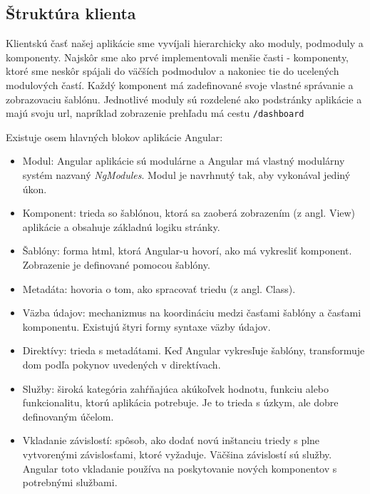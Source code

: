 \subsection{Štruktúra klienta}
\label{subsec:client_structure}

Klientskú časť našej aplikácie sme vyvíjali hierarchicky ako moduly, podmoduly a komponenty.
Najskôr sme ako prvé implementovali menšie časti - komponenty, ktoré sme neskôr spájali do
väčších podmodulov a nakoniec tie do ucelených modulových častí. Každý komponent má zadefinované
svoje vlastné správanie a zobrazovaciu šablónu. Jednotlivé moduly sú rozdelené ako podstránky aplikácie
a majú svoju \acrshort{url}, napríklad zobrazenie prehľadu má cestu \texttt{/dashboard}

Existuje osem hlavných blokov aplikácie Angular:
\begin{itemize}
\item Modul: Angular aplikácie sú modulárne a Angular má vlastný modulárny systém
nazvaný \textit{NgModules}. Modul je navrhnutý tak, aby vykonával jediný úkon.
\item Komponent: trieda so šablónou, ktorá sa zaoberá zobrazením (z angl. View) aplikácie
a obsahuje základnú logiku stránky.
\item Šablóny: forma \acrshort{html}, ktorá Angular-u  hovorí, ako má vykresliť
komponent. Zobrazenie je definované pomocou šablóny.
\item Metadáta: hovoria o tom, ako spracovať triedu (z angl. Class).
\item Väzba údajov: mechanizmus na koordináciu medzi časťami šablóny a
časťami komponentu. Existujú štyri formy syntaxe väzby údajov.
\item Direktívy: trieda s metadátami. Keď Angular vykresľuje šablóny,
transformuje \acrshort{dom} podľa pokynov uvedených v direktívach.
\item Služby: široká kategória zahŕňajúca akúkoľvek hodnotu, funkciu alebo
funkcionalitu, ktorú aplikácia potrebuje. Je to trieda s úzkym, ale dobre definovaným
účelom.
\item Vkladanie závislostí: spôsob, ako dodať novú inštanciu triedy s plne vytvorenými
závislosťami, ktoré vyžaduje. Väčšina závislostí sú služby. Angular toto vkladanie
používa na poskytovanie nových komponentov s potrebnými službami.
\end{itemize}


